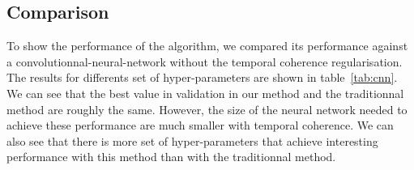 \subsection{Comparison}

To show the performance of the algorithm, we compared its performance against a convolutionnal-neural-network without the temporal coherence regularisation. The results for differents set of hyper-parameters are shown in table~\ref{tab:cnn}. We can see that the best value in validation in our method and the traditionnal method are roughly the same. However, the size of the neural network needed to achieve these performance are much smaller with temporal coherence. We can also see that there is more set of hyper-parameters that achieve interesting performance with this method than with the traditionnal method.

